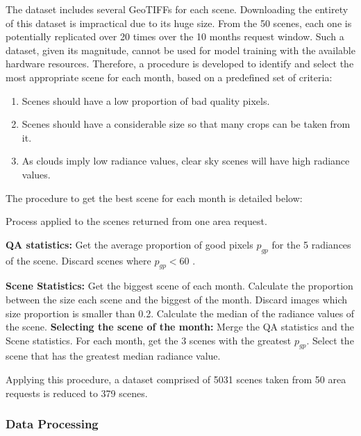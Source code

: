 The dataset includes several GeoTIFFs for each scene. Downloading the entirety of this dataset is impractical due to its huge size.  From the 50 scenes, each one is potentially replicated over 20 times over the 10 months request window. Such a dataset, given its magnitude, cannot be used for model training with the available hardware resources. Therefore, a procedure is developed to identify and select the most appropriate scene for each month, based on a predefined set of criteria:

\begin{enumerate}
\item Scenes should have a low proportion of bad quality pixels.
\item Scenes should have a considerable size so that many crops can be taken from it.
\item As clouds imply low radiance values, clear sky scenes will have high radiance values.
\end{enumerate}


The procedure to get the best scene for each month is detailed below: 

\begin{algorithm}
\caption{Process applied to the scenes returned from one area request.}
\begin{algorithmic}[1]

\State \textbf{QA statistics:}
\State Get the average proportion of good pixels $p_{gp}$ for the 5 radiances of the scene.
\State Discard scenes where $p_{gp} < 60 $ .

\State \textbf{Scene Statistics:}
\State Get the biggest scene of each month.
\State Calculate the proportion between the size each scene and the biggest of the month.
\State Discard images which size proportion is smaller than 0.2.
\State Calculate the median of the radiance values of the scene.
\State \textbf{Selecting the scene of the month:}
\State Merge the QA statistics and the Scene statistics.
\State For each month, get the 3 scenes with the greatest $p_{gp}$.
\State Select the scene that has the greatest median radiance value.
\end{algorithmic}
\end{algorithm}

Applying this procedure, a dataset comprised of 5031 scenes taken from 50 area requests is reduced to 379 scenes.

\subsubsection{Data Processing}


